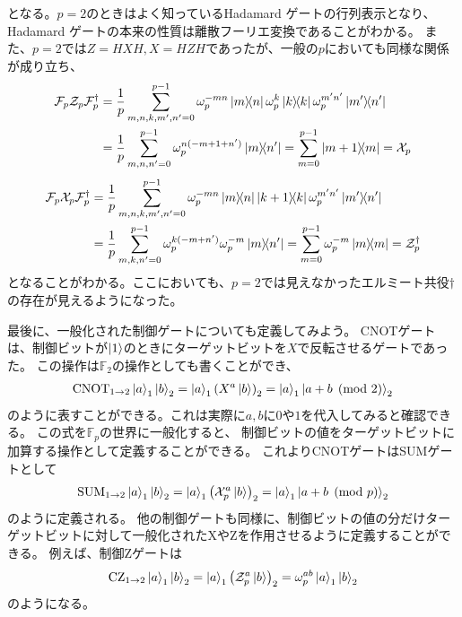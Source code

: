 \documentclass[../master.tex]{subfiles}
\begin{document}
となる。$p=2$のときはよく知っているHadamard ゲートの行列表示となり、
Hadamard ゲートの本来の性質は離散フーリエ変換であることがわかる。
また、$p=2$では$Z=HXH,X=HZH$であったが、一般の$p$においても同様な関係が成り立ち、
\begin{equation}\begin{aligned}[b]
    \mathcal{F}_p \mathcal{Z}_p \mathcal{F}_p^\dagger
    &=\frac{1}{p}\sum_{m,n,k,m',n'=0}^{p-1} \omega_p^{-mn} \ketbra{m}{n} \omega_p^{k}\ketbra{k}{k} \omega_p^{m'n'}\ketbra{m'}{n'} \\
    &=\frac{1}{p}\sum_{m,n,n'=0}^{p-1}\omega_p^{n(-m+1+n')} \ketbra{m}{n'} = \sum_{m=0}^{p-1} \ketbra{m+1}{m} = \mathcal{X}_p
    \label{eq:chap2_FZF}
\end{aligned}\end{equation}
\begin{equation}\begin{aligned}[b]
    \mathcal{F}_p \mathcal{X}_p \mathcal{F}_p^\dagger
    &=\frac{1}{p}\sum_{m,n,k,m',n'=0}^{p-1} \omega_p^{-mn} \ketbra{m}{n} \ketbra{k+1}{k} \omega_p^{m'n'}\ketbra{m'}{n'} \\
    &=\frac{1}{p}\sum_{m,k,n'=0}^{p-1}\omega_p^{k(-m+n')}\omega_p^{-m} \ketbra{m}{n'} = \sum_{m=0}^{p-1} \omega_p^{-m} \ketbra{m}{m} = \mathcal{Z}_p^\dagger
\end{aligned}\end{equation}
となることがわかる。ここにおいても、$p=2$では見えなかったエルミート共役$\dagger$の存在が見えるようになった。

最後に、一般化された制御ゲートについても定義してみよう。
CNOTゲートは、制御ビットが$\ket{1}$のときにターゲットビットを$X$で反転させるゲートであった。
この操作は$\mathbb{F}_2$の操作としても書くことができ、
\begin{equation}\begin{aligned}[b]
    \text{CNOT}_{1\to 2}\ket{a}_1\ket{b}_2 = \ket{a}_1 \qty(X^{a}\ket{b})_2 = \ket{a}_1\ket{a+b \pmod 2}_2
\end{aligned}\end{equation}
のように表すことができる。これは実際に$a,b$に$0$や$1$を代入してみると確認できる。
この式を$\mathbb{F}_p$の世界に一般化すると、
制御ビットの値をターゲットビットに加算する操作として定義することができる。
これよりCNOTゲートはSUMゲートとして
\begin{equation}\begin{aligned}[b]
    \text{SUM}_{1\to 2}\ket{a}_1\ket{b}_2 = \ket{a}_1\qty(\mathcal{X}_p^a\ket{b})_2 = \ket{a}_1\ket{a+b \pmod p}_2
\end{aligned}\end{equation}
のように定義される。
他の制御ゲートも同様に、制御ビットの値の分だけターゲットビットに対して一般化されたXやZを作用させるように定義することができる。
例えば、制御Zゲートは
\begin{equation}\begin{aligned}[b]
    \text{CZ}_{1\to 2}\ket{a}_1\ket{b}_2 = \ket{a}_1\qty(\mathcal{Z}_p^a\ket{b})_2 = \omega_p^{ab} \ket{a}_1\ket{b}_2
\end{aligned}\end{equation}
のようになる。
\end{document}
